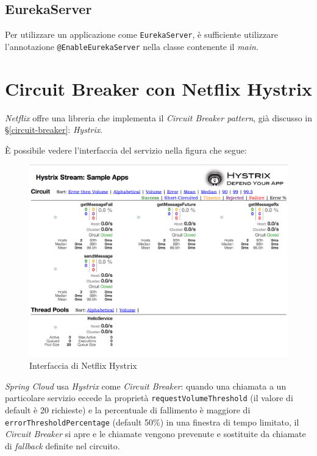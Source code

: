 \subsection{EurekaServer} Per utilizzare un applicazione come \texttt{EurekaServer}, è sufficiente utilizzare l'annotazione \texttt{@EnableEurekaServer} nella classe contenente il \textit{main}.


\section{Circuit Breaker con Netflix Hystrix}

\textit{Netflix} offre una libreria che implementa il \textit{Circuit Breaker pattern}, già discusso in \S\ref{circuit-breaker}: \textit{Hystrix}.

È possibile vedere l'interfaccia del servizio nella figura che segue:

\begin{figure}[H]
	\centering
	\includegraphics[width=\textwidth]{immagini/Hystrix.png}
	\caption[Interfaccia di Netflix Hystrix]{Interfaccia di Netflix Hystrix\footnotemark}
	\label{netflix-hystrix}
\end{figure}

\textit{Spring Cloud} usa \textit{Hystrix} come \textit{Circuit Breaker}:
quando una chiamata a un particolare servizio eccede la proprietà \texttt{requestVolumeThreshold} (il valore di default è 20 richieste) e la percentuale di fallimento è maggiore di \texttt{errorThresholdPercentage} (default 50\%) in una finestra di tempo limitato,
il \textit{Circuit Breaker} si apre e le chiamate vengono prevenute e sostituite da chiamate di \textit{fallback} definite nel circuito.

